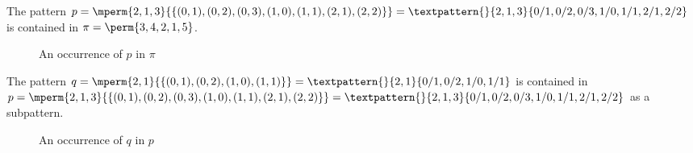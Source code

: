 \begin{frame}
  \begin{example}
      The pattern \(p=\mperm{2,1,3}{\{(0,1),(0,2),(0,3),(1,0),(1,1),(2,1),(2,2)\}}=
      \textpattern{}{ 2, 1, 3 }{ 0/1, 0/2,0/3, 1/0, 1/1, 2/1, 2/2 }\) is contained in
      \(\pi = \perm{3,4,2,1,5}\).
      \begin{figure}[htb]
        \centering
      \caption{ An occurrence of \(p\) in \(\pi\) }
      \end{figure}
  \end{example}
\end{frame}

\begin{frame}
  \begin{example}
      The pattern \(q=\mperm{2,1}{\{(0,1),(0,2),(1,0),(1,1)\}}=
      \textpattern{}{ 2, 1 }{ 0/1, 0/2, 1/0, 1/1}\) is contained in
      \(p=\mperm{2,1,3}{\{(0,1),(0,2),(0,3),(1,0),(1,1),(2,1),(2,2)\}}=
      \textpattern{}{ 2, 1, 3 }{ 0/1, 0/2,0/3, 1/0, 1/1, 2/1, 2/2 }\) as a
      subpattern.
      \begin{figure}[htb]
        \centering
      \caption{ An occurrence of \(q\) in \(p\) }
      \end{figure}
  \end{example}
\end{frame}
